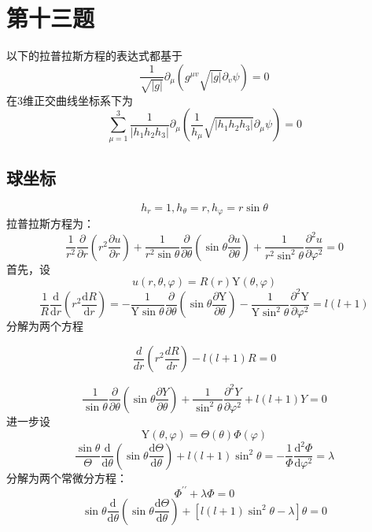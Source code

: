 \documentclass[a4paper]{ctexart}
\begin{document}
\section{第十三题}
以下的拉普拉斯方程的表达式都基于
$$
    \frac{1}{\sqrt{|g|}} \partial_{\mu}\left(g^{\mu v} \sqrt{|g|} \partial_{v} \psi\right)=0
$$
在3维正交曲线坐标系下为
$$
    \sum_{\mu =1}^3{\frac{1}{|h_1h_2h_3|}\partial _{\mu}\left( \frac{1}{h_{\mu}}\sqrt{|h_1h_2h_3|}\partial _{\mu}\psi \right)}=0
$$

\subsection{球坐标}
$$
    h_r=1,h_{\theta}=r,h_{\varphi}=r\sin \theta
$$
拉普拉斯方程为：
\[
    \frac{1}{r^{2}} \frac{\partial}{\partial r}\left(r^{2} \frac{\partial u}{\partial r}\right)+\frac{1}{r^{2} \sin \theta} \frac{\partial}{\partial \theta}\left(\sin \theta \frac{\partial u}{\partial \theta}\right)+\frac{1}{r^{2} \sin ^{2} \theta} \frac{\partial^{2} u}{\partial \varphi^{2}}=0
\]
首先，设
\[
    u(r, \theta, \varphi)=R(r) \mathrm{Y}(\theta, \varphi)
\]
\[
    \frac{1}{R} \frac{\mathrm{d}}{\mathrm{d} r}\left(r^{2} \frac{\mathrm{d} R}{\mathrm{d} r}\right)=-\frac{1}{\mathrm{Y} \sin \theta} \frac{\partial}{\partial \theta}\left(\sin \theta \frac{\partial \mathrm{Y}}{\partial \theta}\right)-\frac{1}{\mathrm{Y} \sin ^{2} \theta} \frac{\partial^{2} \mathrm{Y}}{\partial \varphi^{2}}=l(l+1)
\]
分解为两个方程

\begin{equation}
    \frac{d}{d r}\left(r^{2} \frac{d R}{d r}\right)-l(l+1) R = 0
\end{equation}

\[
    \frac{1}{\sin \theta} \frac{\partial}{\partial \theta}\left(\sin \theta \frac{\partial Y}{\partial \theta}\right)+\frac{1}{\sin ^{2} \theta} \frac{\partial^{2} Y}{\partial \varphi^{2}}+l(l+1) Y=0
\]
进一步设
\[
    \mathrm{Y}(\theta, \varphi)=\Theta(\theta) \Phi(\varphi)
\]
\[
    \frac{\sin \theta}{\Theta} \frac{\mathrm{d}}{\mathrm{d} \theta}\left(\sin \theta \frac{\mathrm{d} \Theta}{\mathrm{d} \theta}\right)+l(l+1) \sin ^{2} \theta=-\frac{1}{\Phi} \frac{\mathrm{d}^{2} \Phi}{\mathrm{d} \varphi^{2}}=\lambda
\]
分解为两个常微分方程：
\begin{equation}
    \Phi^{\prime \prime}+\lambda \Phi=0
\end{equation}
\begin{equation}
    \sin \theta \frac{\mathrm{d}}{\mathrm{d} \theta}\left(\sin \theta \frac{\mathrm{d} \Theta}{\mathrm{d} \theta}\right)+\left[l(l+1) \sin ^{2} \theta-\lambda\right] \theta=0
\end{equation}
\end{document}
